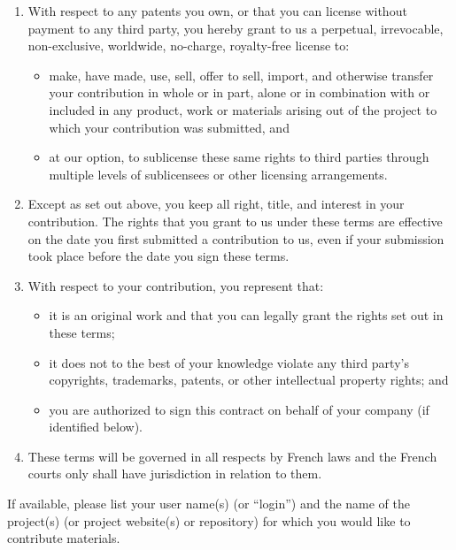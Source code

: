 \begin{enumerate}
\item With respect to any patents you own, or that you can license without
  payment to any third party, you hereby grant to us a perpetual,
  irrevocable, non-exclusive, worldwide, no-charge, royalty-free license to:

  \begin{itemize}
  \item make, have made, use, sell, offer to sell, import, and otherwise
    transfer your contribution in whole or in part, alone or in combination
    with or included in any product, work or materials arising out of the
    project to which your contribution was submitted, and

  \item at our option, to sublicense these same rights to third parties
    through multiple levels of sublicensees or other licensing arrangements.
  \end{itemize}

\item Except as set out above, you keep all right, title, and interest in
  your contribution. The rights that you grant to us under these terms are
  effective on the date you first submitted a contribution to us, even if
  your submission took place before the date you sign these terms.

\item With respect to your contribution, you represent that:
  \begin{itemize}
  \item it is an original work and that you can legally grant the rights set
    out in these terms;

  \item it does not to the best of your knowledge violate any third party's
    copyrights, trademarks, patents, or other intellectual property rights;
    and

  \item you are authorized to sign this contract on behalf of your company
    (if identified below).
  \end{itemize}

\item These terms will be governed in all respects by French laws and the
  French courts only shall have jurisdiction in relation to them.
\end{enumerate}

If available, please list your user name(s) (or ``login'') and the name of
the project(s) (or project website(s) or repository) for which you would
like to contribute materials.

